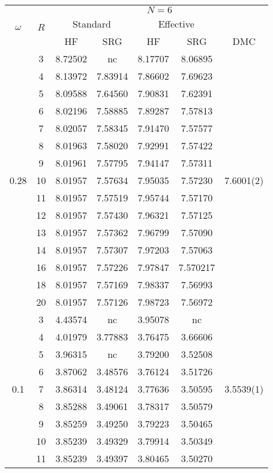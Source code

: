 \begin{table}
\begin{center}
\tabcolsep=0.35cm
\begin{tabular}{|c|c|c|c|c|c|c|}
\hline
\multirow{3}{*}{$\omega$} & \multirow{3}{*}{$R$} & \multicolumn{5}{|c|}{$N=6$} \\
& & \multicolumn{2}{|c|}{Standard} & \multicolumn{2}{|c|}{Effective} &  \\
& & HF & SRG & HF & SRG & DMC \\
\hline\hline
\multirow{15}{*}{0.28} & 3&8.72502 &nc &8.17707 &8.06895 & \multirow{15}{*}{7.6001(2)} \\ %
& 4&8.13972 &7.83914 &7.86602 &7.69623 & \\
& 5& 8.09588 &7.64560 &7.90831 &7.62391 & \\
& 6&8.02196 &7.58885 &7.89287 &7.57813 & \\
& 7&8.02057 &7.58345 &7.91470 &7.57577 & \\
& 8&8.01963 &7.58020 &7.92991 &7.57422 & \\
& 9&8.01961 &7.57795 &7.94147 &7.57311 & \\
& 10&8.01957 &7.57634 &7.95035 &7.57230 & \\
& 11&8.01957 &7.57519 &7.95744 &7.57170 & \\
& 12&8.01957 &7.57430 &7.96321 &7.57125 & \\
& 13&8.01957 &7.57362 &7.96799 &7.57090 & \\
&14 &8.01957 &7.57307 & 7.97203&7.57063 & \\
&16 &8.01957 &7.57226 &7.97847 &7.570217 & \\
& 18&8.01957 &7.57169 &7.98337 &7.56993 & \\
& 20&8.01957 &7.57126 &7.98723 &7.56972 & \\
\hline
\multirow{15}{*}{0.1} & 3&4.43574 &nc & 3.95078&nc & \multirow{15}{*}{3.5539(1)} \\
& 4&4.01979 &3.77883 &3.76475 &3.66606 & \\
& 5&3.96315 & nc&3.79200 &3.52508 & \\
& 6&3.87062 &3.48576 &3.76124 &3.51726 & \\
& 7&3.86314 &3.48124 &3.77636 &3.50595 & \\
& 8&3.85288 &3.49061 &3.78317 &3.50579 & \\
& 9&3.85259 &3.49250 &3.79223 &3.50465 & \\
& 10&3.85239 &3.49329 &3.79914 &3.50349 & \\
& 11&3.85239 &3.49397 &3.80465 &3.50270 & \\

\end{tabular}
\end{center}
\end{table}
